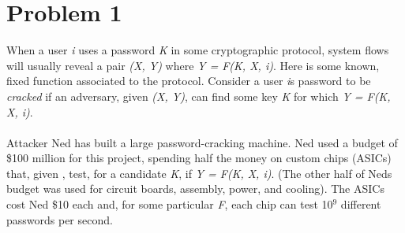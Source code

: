 \documentclass[paper=letter, fontsize=12pt]{article}
\title{
\normalfont \normalsize
\horrule{0.5pt} \\[0.3cm]
\huge Problem Set #1 \\
\horrule{0.5pt} \\[0.3cm]
}
\author{Andrew Kaufman \\ SID: 998048873}
\date{\normalsize\today}
\begin{document}
\maketitle

\section*{Problem 1}
When a user \textit{i} uses a password \textit{K} in some cryptographic protocol, system flows will usually
reveal a pair \textit{(X, Y)} where \textit{Y = F(K, X, i)}. Here  is some known, fixed function associated to the
protocol. Consider a user \textit{i}\textquotesingle s password to be \textit{cracked} if an adversary, given \textit{(X, Y)}, can find some
key \textit{K} for which \textit{Y = F(K, X, i)}.\\
\\Attacker Ned has built a large password-cracking machine. Ned used a budget of \$100 million
for this project, spending half the money on custom chips (ASICs) that, given , test, for
a candidate \textit{K}, if \textit{Y = F(K, X, i)}. (The other half of Ned\textquotesingle s budget was used for circuit boards,
assembly, power, and cooling). The ASICs cost Ned \$10 each and, for some particular \textit{F}, each chip
can test 10\(^9\) different passwords per second.
\end{document}
